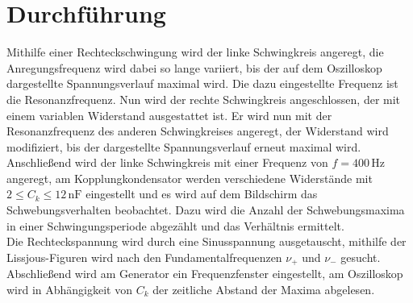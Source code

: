 \section{Durchführung}
\label{sec:Durchführung}
Mithilfe einer Rechteckschwingung wird der linke Schwingkreis angeregt, die Anregungsfrequenz wird dabei so lange variiert, bis der auf dem Oszilloskop dargestellte Spannungsverlauf maximal wird. Die dazu eingestellte
Frequenz ist die Resonanzfrequenz. Nun wird der rechte Schwingkreis angeschlossen, der mit einem variablen Widerstand ausgestattet ist. Er wird nun mit der Resonanzfrequenz des anderen Schwingkreises angeregt, der
Widerstand wird modifiziert, bis der dargestellte Spannungsverlauf erneut maximal wird. \\

Anschließend wird der linke Schwingkreis mit einer Frequenz von $f = 400 \, \unit{\hertz}$ angeregt, am Kopplungkondensator werden verschiedene Widerstände mit $2 \leq C_k \leq 12 \, \unit{\nano\farad}$ eingestellt und
es wird auf dem Bildschirm das Schwebungsverhalten beobachtet. Dazu wird die Anzahl der Schwebungsmaxima in einer Schwingungsperiode abgezählt und das Verhältnis ermittelt. \\

Die Rechteckspannung wird durch eine Sinusspannung ausgetauscht, mithilfe der Lissjous-Figuren wird nach den Fundamentalfrequenzen $ν_+$ und $ν_-$ gesucht. \\

Abschließend wird am Generator ein Frequenzfenster eingestellt, am Oszilloskop wird in Abhängigkeit von $C_k$ der zeitliche Abstand der Maxima abgelesen.